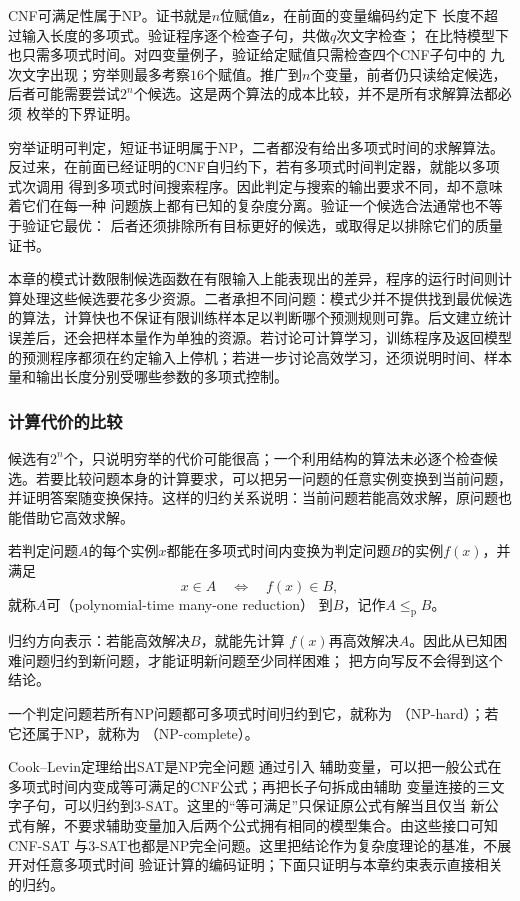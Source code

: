 CNF可满足性属于$\mathrm{NP}$。证书就是$n$位赋值$\bm z$，在前面的变量编码约定下
长度不超过输入长度的多项式。验证程序逐个检查子句，共做$q$次文字检查；
在比特模型下也只需多项式时间。对四变量例子，验证给定赋值只需检查四个CNF子句中的
九次文字出现；穷举则最多考察$16$个赋值。推广到$n$个变量，前者仍只读给定候选，
后者可能需要尝试$2^n$个候选。这是两个算法的成本比较，并不是所有求解算法都必须
枚举的下界证明。

穷举证明可判定，短证书证明属于NP，二者都没有给出多项式时间的求解算法。
反过来，在前面已经证明的CNF自归约下，若有多项式时间判定器，就能以多项式次调用
得到多项式时间搜索程序。因此判定与搜索的输出要求不同，却不意味着它们在每一种
问题族上都有已知的复杂度分离。验证一个候选合法通常也不等于验证它最优：
后者还须排除所有目标更好的候选，或取得足以排除它们的质量证书。

本章的模式计数限制候选函数在有限输入上能表现出的差异，程序的运行时间则计算处理这些候选要花多少资源。二者承担不同问题：模式少并不提供找到最优候选的算法，计算快也不保证有限训练样本足以判断哪个预测规则可靠。后文建立统计误差后，还会把样本量作为单独的资源。若讨论可计算学习，训练程序及返回模型的预测程序都须在约定输入上停机；若进一步讨论高效学习，还须说明时间、样本量和输出长度分别受哪些参数的多项式控制。

\subsubsection{计算代价的比较}
\label{sec:comb-reductions}

候选有$2^n$个，只说明穷举的代价可能很高；一个利用结构的算法未必逐个检查候选。若要比较问题本身的计算要求，可以把另一问题的任意实例变换到当前问题，并证明答案随变换保持。这样的归约关系说明：当前问题若能高效求解，原问题也能借助它高效求解。

\begin{definition}[多项式时间多对一归约]
\label{def:comb-polynomial-reduction}
若判定问题$A$的每个实例$x$都能在多项式时间内变换为判定问题$B$的实例$f(x)$，并满足
\[
  x\in A\quad\Longleftrightarrow\quad f(x)\in B,
\]
就称$A$可（polynomial-time many-one reduction）
到$B$，记作$A\leq_{\mathrm{p}}B$。
\end{definition}
归约方向表示：若能高效解决$B$，就能先计算
$f(x)$再高效解决$A$。因此从已知困难问题归约到新问题，才能证明新问题至少同样困难；
把方向写反不会得到这个结论。

\begin{definition}[NP困难与NP完全]
\label{def:comb-np-hard-complete}
一个判定问题若所有$\mathrm{NP}$问题都可多项式时间归约到它，就称为
（NP-hard）；若它还属于$\mathrm{NP}$，就称为
（NP-complete）。
\end{definition}
Cook--Levin定理给出SAT是NP完全问题
通过引入
辅助变量，可以把一般公式在多项式时间内变成等可满足的CNF公式；再把长子句拆成由辅助
变量连接的三文字子句，可以归约到3-SAT。这里的“等可满足”只保证原公式有解当且仅当
新公式有解，不要求辅助变量加入后两个公式拥有相同的模型集合。由这些接口可知CNF-SAT
与3-SAT也都是NP完全问题。这里把结论作为复杂度理论的基准，不展开对任意多项式时间
验证计算的编码证明；下面只证明与本章约束表示直接相关的归约。

